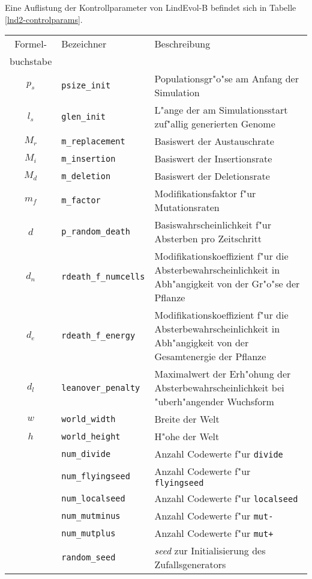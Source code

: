 Eine Auflistung der Kontrollparameter von LindEvol-B befindet sich in Tabelle \ref{lnd2-controlparams}.


\begin{table}[tb]

\noindent\begin{tabularx}{\linewidth}{|c|l|X|} \hline
Formel- & Bezeichner              & Beschreibung \\
buchstabe &                       & \\ \hline
$p_s$ & \verb|psize_init|         & Populationsgr"o"se am Anfang der Simulation \\
$l_s$ & \verb|glen_init|          & L"ange der am Simulationsstart zuf"allig generierten Genome \\
$M_r$ & \verb|m_replacement|      & Basiswert der Austauschrate \\
$M_i$ & \verb|m_insertion|        & Basiswert der Insertionsrate \\
$M_d$ & \verb|m_deletion|         & Basiswert der Deletionsrate \\
$m_f$ & \verb|m_factor|           & Modifikationsfaktor f"ur Mutationsraten \\
$d$   & \verb|p_random_death|     & Basiswahrscheinlichkeit f"ur Absterben pro Zeitschritt \\
$d_n$ & \verb|rdeath_f_numcells|  & Modifikationskoeffizient f"ur die Absterbewahrscheinlichkeit
                                    in Abh"angigkeit von der Gr"o"se der Pflanze \\
$d_e$ & \verb|rdeath_f_energy|    & Modifikationskoeffizient f"ur die Absterbewahrscheinlichkeit
                                    in Abh"angigkeit von der Gesamtenergie der Pflanze \\
$d_l$ & \verb|leanover_penalty|   & Maximalwert der Erh"ohung der Absterbewahrscheinlichkeit
                                    bei "uberh"angender Wuchsform \\
$w$   & \verb|world_width|        & Breite der Welt \\
$h$   & \verb|world_height|       & H"ohe der Welt \\
      & \verb|num_divide|         & Anzahl Codewerte f"ur \verb|divide| \\
      & \verb|num_flyingseed|     & Anzahl Codewerte f"ur \verb|flyingseed| \\
      & \verb|num_localseed|      & Anzahl Codewerte f"ur \verb|localseed| \\
      & \verb|num_mutminus|       & Anzahl Codewerte f"ur \verb|mut-| \\
      & \verb|num_mutplus|        & Anzahl Codewerte f"ur \verb|mut+| \\
      & \verb|random_seed|        & {\slshape seed} zur Initialisierung des Zufallsgenerators \\ \hline
\end{tabularx}


\end{table}
